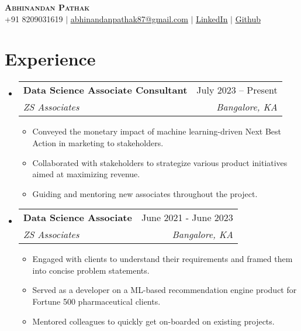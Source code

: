 \documentclass[letterpaper,11pt]{article}
\makeatletter
\newcommand{\resumeItem}[1]{
  \item\small{
    {#1 \vspace{-4pt}}
  }
}
\newcommand{\resumeSubheading}[4]{
  \vspace{-4pt}\item
    \begin{tabular*}{0.97\textwidth}[t]{l@{\extracolsep{\fill}}r}
      \textbf{#1} & #2 \\
      \textit{\small#3} & \textit{\small #4} \\
    \end{tabular*}\vspace{-10pt}
}
\newcommand{\resumeSubHeadingListStart}{\begin{itemize}[leftmargin=0.1in, label={}]}
\newcommand{\resumeSubHeadingListEnd}{\end{itemize}}
\newcommand{\resumeItemListStart}{\begin{itemize}}
\newcommand{\resumeItemListEnd}{\end{itemize}\vspace{-1pt}}
\makeatother
\begin{document}

\begin{center}
    \textbf{\Large \scshape Abhinandan Pathak} \\ \vspace{1pt}
    \small +91 8209031619 $|$ \href{mailto:x@x.com}{\underline{abhinandanpathak87@gmail.com}} $|$ 
    \href{https://linkedin.com/in/abhinandan-pathak-0abbaa176/}{\underline{LinkedIn}} $|$
    \href{https://github.com/abhinandan1999}{\underline{Github}}
\end{center}

\section{Experience}
  \resumeSubHeadingListStart

    \resumeSubheading
      {Data Science Associate Consultant}{July 2023 -- Present}
      {ZS Associates}{Bangalore, KA}
      \resumeItemListStart
        \resumeItem{Conveyed the monetary impact of machine learning-driven Next Best Action in marketing to stakeholders.}
        \resumeItem{Collaborated with stakeholders to strategize various product initiatives aimed at maximizing revenue.}
        \resumeItem{Guiding and mentoring new associates throughout the project.}
      \resumeItemListEnd

    \resumeSubheading
      {Data Science Associate}{June 2021 - June 2023}
      {ZS Associates}{Bangalore, KA}
      \resumeItemListStart
        \resumeItem{Engaged with clients to understand their requirements and framed them into concise problem statements.}
        \resumeItem{Served as a developer on a ML-based recommendation engine product for Fortune 500 pharmaceutical clients.}
        \resumeItem{Mentored colleagues to quickly get on-boarded on existing projects.}
        
    \resumeItemListEnd

  \resumeSubHeadingListEnd


\end{document}
